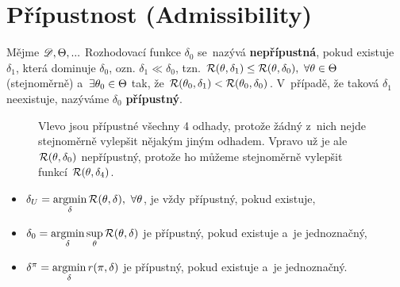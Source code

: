 \section{Přípustnost (Admissibility)}
\begin{define}
	Mějme $\mathscr{D} ,\Theta,...$ Rozhodovací funkce $\delta_0$ se~nazývá \textbf{nepřípustná}, pokud existuje $\delta_1$, která dominuje $\delta_0$, ozn. $\delta_1\ll\delta_0$, tzn. $\mathcal{R}(\theta,\delta_1)\leq\mathcal{R}(\theta,\delta_0),~\forall\theta\in\Theta$ (stejnoměrně) a~$\exists\theta_0\in\Theta$ tak, že $\mathcal{R}(\theta_0,\delta_1)<\mathcal{R}(\theta_0,\delta_0)$. V~případě, že taková $\delta_1$ neexistuje, nazýváme $\delta_0$ \textbf{přípustný}.
	
	\begin{figure}[h]
		\centering
		\caption{Vlevo jsou přípustné všechny 4 odhady, protože žádný z~nich nejde stejnoměrně vylepšit nějakým jiným odhadem. Vpravo už je ale $\mathcal{R}(\theta,\delta_0)$ nepřípustný, protože ho můžeme stejnoměrně vylepšit funkcí $\mathcal{R}(\theta,\delta_4)$.}
		\label{fig:92}
	\end{figure}
	
\end{define}
\begin{theorem}\label{veta_pripustna}
	\begin{itemize}
		\item  $\delta_U=\mathop{\mathrm{argmin}}\limits_\delta\mathcal{R}(\theta,\delta),~\forall\theta$, je vždy přípustný, pokud existuje, \item  $\delta_0=\mathop{\mathrm{argmin}}\limits_\delta\sup\limits_\theta\mathcal{R}(\theta,\delta)$ je přípustný, pokud existuje a~je jednoznačný, \item  $\delta^\pi=\mathop{\mathrm{argmin}}\limits_\delta r(\pi,\delta)$ je přípustný, pokud existuje a~je jednoznačný.
	\end{itemize}
\end{theorem}

